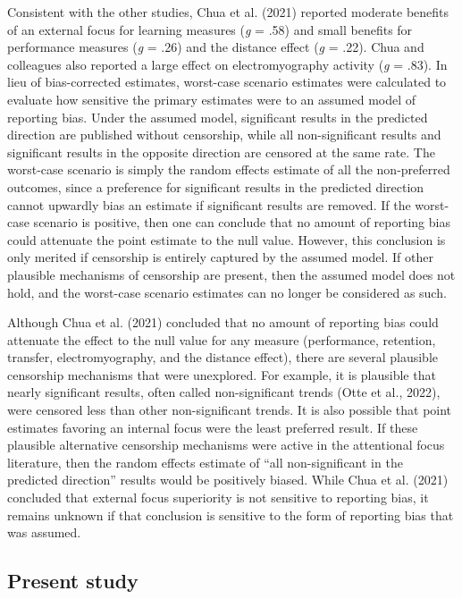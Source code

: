 \documentclass[
  man, donotrepeattitle,floatsintext]{apa7}
\begin{document}
Consistent with the other studies, Chua et al. (2021) reported moderate benefits of an external focus for learning measures (\emph{g} = .58) and small benefits for performance measures (\emph{g} = .26) and the distance effect (\emph{g} = .22). Chua and colleagues also reported a large effect on electromyography activity (\emph{g} = .83). In lieu of bias-corrected estimates, worst-case scenario estimates were calculated to evaluate how sensitive the primary estimates were to an assumed model of reporting bias. Under the assumed model, significant results in the predicted direction are published without censorship, while all non-significant results and significant results in the opposite direction are censored at the same rate. The worst-case scenario is simply the random effects estimate of all the non-preferred outcomes, since a preference for significant results in the predicted direction cannot upwardly bias an estimate if significant results are removed. If the worst-case scenario is positive, then one can conclude that no amount of reporting bias could attenuate the point estimate to the null value. However, this conclusion is only merited if censorship is entirely captured by the assumed model. If other plausible mechanisms of censorship are present, then the assumed model does not hold, and the worst-case scenario estimates can no longer be considered as such.

Although Chua et al. (2021) concluded that no amount of reporting bias could attenuate the effect to the null value for any measure (performance, retention, transfer, electromyography, and the distance effect), there are several plausible censorship mechanisms that were unexplored. For example, it is plausible that nearly significant results, often called non-significant trends (Otte et al., 2022), were censored less than other non-significant trends. It is also possible that point estimates favoring an internal focus were the least preferred result. If these plausible alternative censorship mechanisms were active in the attentional focus literature, then the random effects estimate of ``all non-significant in the predicted direction'' results would be positively biased. While Chua et al. (2021) concluded that external focus superiority is not sensitive to reporting bias, it remains unknown if that conclusion is sensitive to the form of reporting bias that was assumed.

\hypertarget{present-study}{%
\subsection{Present study}\label{present-study}}
\end{document}
